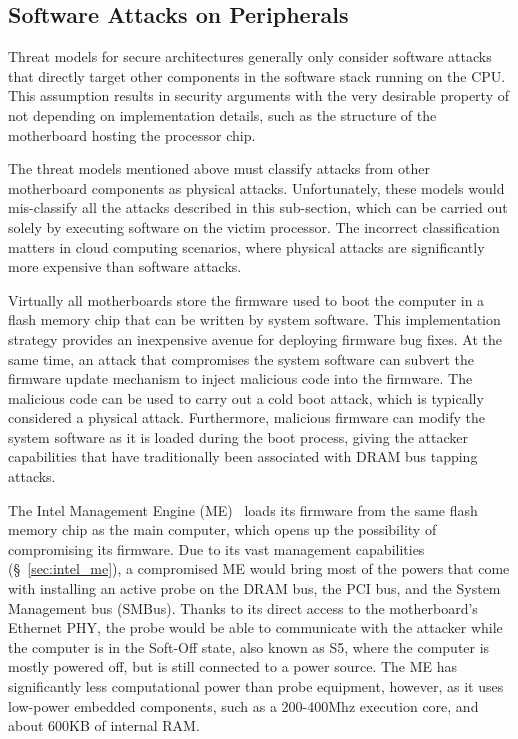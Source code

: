 \subsection{Software Attacks on Peripherals}
\label{sec:device_attacks}

Threat models for secure architectures generally only consider software attacks
that directly target other components in the software stack running on the CPU.
This assumption results in security arguments with the very desirable property
of not depending on implementation details, such as the structure of the
motherboard hosting the processor chip.

The threat models mentioned above must classify attacks from other motherboard
components as physical attacks. Unfortunately, these models would mis-classify
all the attacks described in this sub-section, which can be carried out solely
by executing software on the victim processor. The incorrect classification
matters in cloud computing scenarios, where physical attacks are significantly
more expensive than software attacks.

Virtually all motherboards store the firmware used to boot the computer in a
flash memory chip that can be written by system software. This implementation
strategy provides an inexpensive avenue for deploying firmware bug fixes. At
the same time, an attack that compromises the system software can subvert the
firmware update mechanism to inject malicious code into the firmware. The
malicious code can be used to carry out a cold boot attack, which is typically
considered a physical attack. Furthermore, malicious firmware can modify the
system software as it is loaded during the boot process, giving the attacker
capabilities that have traditionally been associated with DRAM bus tapping
attacks.

The Intel Management Engine (ME)~\cite{ruan2014intelme} loads its firmware
from the same flash memory chip as the main computer, which opens up the
possibility of compromising its firmware. Due to its vast management
capabilities (\S~\ref{sec:intel_me}), a compromised ME would bring most of the
powers that come with installing an active probe on the DRAM bus, the PCI bus,
and the System Management bus (SMBus). Thanks to its direct access to the
motherboard's Ethernet PHY, the probe would be able to communicate with the
attacker while the computer is in the Soft-Off state, also known as S5, where
the computer is mostly powered off, but is still connected to a power source.
The ME has significantly less computational power than probe equipment,
however, as it uses low-power embedded components, such as a 200-400Mhz
execution core, and about 600KB of internal RAM.


